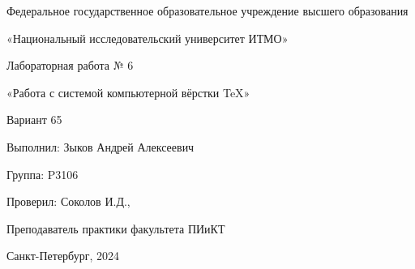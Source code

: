 
\begin{center}
    Федеральное государственное образовательное учреждение высшего образования 
    
    «Национальный исследовательский университет ИТМО»

    \vspace{9cm}
    Лабораторная работа № 6
    
    «Работа с системой компьютерной вёрстки \TeX{}»

    Вариант 65
\end{center}

\vspace{3cm}
\begin{flushright}
    Выполнил: Зыков Андрей Алексеевич

    Группа: P3106

    Проверил: Соколов И.Д.,

    Преподаватель практики факультета ПИиКТ
\end{flushright}

\vspace{7cm}
\begin{center}
    Санкт-Петербург, 2024
\end{center}
\vspace{1cm}